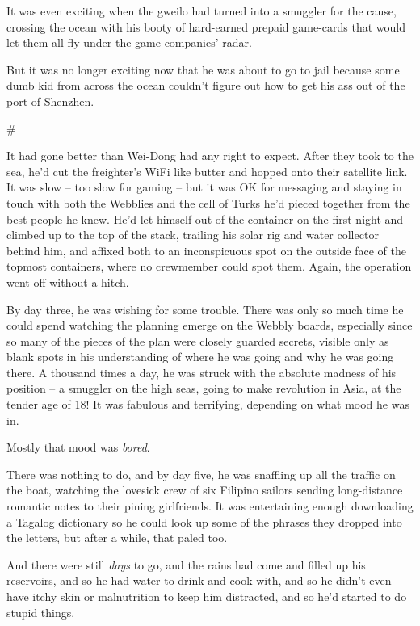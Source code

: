 It was even exciting when the gweilo had turned into a smuggler for
the cause, crossing the ocean with his booty of hard-earned prepaid
game-cards that would let them all fly under the game companies'
radar.

But it was no longer exciting now that he was about to go to jail
because some dumb kid from across the ocean couldn't figure out how
to get his ass out of the port of Shenzhen.

\#

It had gone better than Wei-Dong had any right to expect. After
they took to the sea, he'd cut the freighter's WiFi like butter and
hopped onto their satellite link. It was slow -- too slow for
gaming -- but it was OK for messaging and staying in touch with
both the Webblies and the cell of Turks he'd pieced together from
the best people he knew. He'd let himself out of the container on
the first night and climbed up to the top of the stack, trailing
his solar rig and water collector behind him, and affixed both to
an inconspicuous spot on the outside face of the topmost
containers, where no crewmember could spot them. Again, the
operation went off without a hitch.

By day three, he was wishing for some trouble. There was only so
much time he could spend watching the planning emerge on the Webbly
boards, especially since so many of the pieces of the plan were
closely guarded secrets, visible only as blank spots in his
understanding of where he was going and why he was going there. A
thousand times a day, he was struck with the absolute madness of
his position -- a smuggler on the high seas, going to make
revolution in Asia, at the tender age of 18! It was fabulous and
terrifying, depending on what mood he was in.

Mostly that mood was \emph{bored}.

There was nothing to do, and by day five, he was snaffling up all
the traffic on the boat, watching the lovesick crew of six Filipino
sailors sending long-distance romantic notes to their pining
girlfriends. It was entertaining enough downloading a Tagalog
dictionary so he could look up some of the phrases they dropped
into the letters, but after a while, that paled too.

And there were still \emph{days} to go, and the rains had come and
filled up his reservoirs, and so he had water to drink and cook
with, and so he didn't even have itchy skin or malnutrition to keep
him distracted, and so he'd started to do stupid things.

